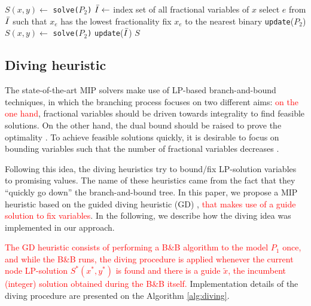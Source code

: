 \documentclass{ro}
\begin{document}
\begin{algorithm}[!h]
	\caption{\hspace{-1mm}\textbf{: RF }($P_2$)}
	\label{alg:rf}
	{\footnotesize
		\begin{algorithmic}[1]	
			\STATE $S(x,y)\gets$ \texttt{solve($P_2$)} 
			\STATE $\Bar{I} \gets$ index set of all fractional variables of $x$
			\STATE select $e$ from $\Bar{I}$ such that $x_e$ has the lowest fractionality 
			\STATE fix $x_e$ to the nearest binary
			\STATE \texttt{update}($P_2$)
			\STATE $S(x,y)\gets$ \texttt{solve($P_2$)} 
			\STATE \texttt{update}($\Bar{I}$)
			\ENDWHILE
			\RETURN $S$
		\end{algorithmic}
	}
\end{algorithm}

\subsection{Diving heuristic}

The state-of-the-art MIP solvers make use of  LP-based branch-and-bound techniques, in which the branching process focuses on two different aims:  \textcolor{red}{on the one hand}, fractional variables should be driven towards integrality  to find feasible solutions. On the other hand, the dual bound should be raised  to prove the optimality \cite{achterberg2009hybrid}. To achieve feasible solutions quickly, it is desirable to focus on bounding variables such that the number of fractional variables decreases \cite{berthold2006primal}.

Following this idea, the diving heuristics try  to bound/fix LP-solution variables to promising values. The name of these heuristics came from the fact that they ``quickly go down'' the branch-and-bound tree. In this paper, we propose a MIP heuristic based on the guided diving  heuristic (GD) \cite{achterberg2005branching}, \textcolor{red}{that makes use of a guide solution to fix variables}. In the following, we describe how the diving idea was implemented in our approach.


\textcolor{red}{The GD heuristic consists of performing a B\&B algorithm to the model $P_1$ once, and while the B\&B runs, the diving procedure is applied whenever the current node LP-solution $S^*(x^*,y^*)$ is found and there is a guide $\tilde{x}$, the incumbent (integer) solution obtained during the B\&B itself.} Implementation details of the diving procedure are presented on the Algorithm \ref{alg:diving}.
\end{document}
